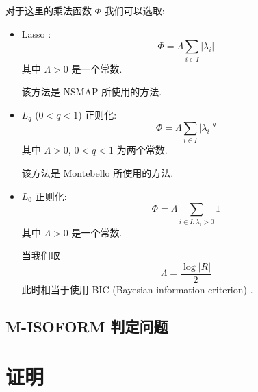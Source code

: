 对于这里的乘法函数 $\Phi$ 我们可以选取: 
\begin{itemize}
\item Lasso \cite{tibshirani1996regression}:
\[
\Phi = \Lambda \sum_{i \in I} |\lambda_i|
\]
其中 $\Lambda > 0$ 是一个常数. 

该方法是 NSMAP \cite{nsmap.21575225} 所使用的方法. 

\item $L_q$ ($0<q<1$) 正则化:
\[
\Phi = \Lambda \sum_{i \in I} |\lambda_i|^q
\]
其中 $\Lambda > 0$, $0 <q<1$ 为两个常数. 

该方法是 Montebello \cite{Hiller.Montebello} 所使用的方法. 

\item $L_0$ 正则化:
\[
\Phi = \Lambda \sum_{i \in I, \lambda_i >0} 1
\]
其中 $\Lambda > 0$ 是一个常数. 

当我们取 
\[
\Lambda = \frac{\log |R|}{2}
\]
此时相当于使用 BIC (Bayesian information criterion) \cite{BIC.Schwarz_1978}. 
\end{itemize}
\subsection{M-ISOFORM 判定问题}

\section{证明}


